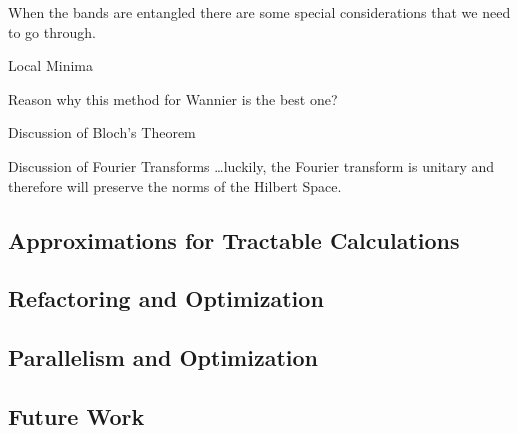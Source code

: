 When the bands are entangled there are some special considerations that
we need to go through.

Local Minima

Reason why this method for Wannier is the best one?

Discussion of Bloch's Theorem

Discussion of Fourier Transforms \ldots{}luckily, the Fourier transform
is unitary and therefore will preserve the norms of the Hilbert Space.

\subsection{Approximations for Tractable
Calculations}\label{approximations-for-tractable-calculations}

\subsection{Refactoring and
Optimization}\label{refactoring-and-optimization}

\subsection{Parallelism and
Optimization}\label{parallelism-and-optimization}

\subsection{Future Work}\label{future-work}
